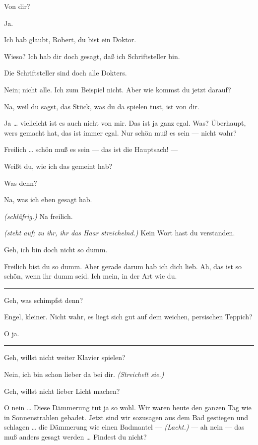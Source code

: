 \documentclass[
	final,
	a4paper,
	ngerman,
	mpinclude = true, %
	twoside = true,
	open = right,
	cleardoublepage = plain,
	DIV = 13,
	BCOR = 1cm,
	titlepage = firstiscover,
	]{scrbook}
\newcommand{\direction}[1]{\textit{(#1)}}
\newenvironment{deletion}{%
		\vspace{0.25\baselineskip}
		\hrule
		\vspace{0.25\baselineskip}
		\color{darkgray}
	}{
		\color{black}
		\vspace{0.25\baselineskip}
		\hrule 
		\vspace{0.25\baselineskip}
	}
\newcommand{\thecharacter}[1]{\textup{\textsc{#1}}\xspace}
\newcommand{\thesuesse}{\thecharacter{Süßes Mädel}}
\newcommand{\thedichter}{\thecharacter{Dichter}}
\newcommand{\character}[1]{\item[#1:]}
\newcommand{\suesse}{\character{\thesuesse}}
\newcommand{\dichter}{\character{\thedichter}}
\begin{document}
\begin{play}
	\suesse
	Von dir?

	\dichter
	Ja.

	\suesse
	Ich hab glaubt, Robert, du bist ein Doktor.

	\dichter
	Wieso? Ich hab dir doch gesagt, daß ich Schriftsteller bin.

	\suesse
	Die Schriftsteller sind doch alle Dokters.

	\dichter
	Nein; nicht alle. Ich zum Beispiel nicht. Aber wie kommst du jetzt darauf?

	\suesse
	Na, weil du sagst, das Stück, was du da spielen tust, ist von dir.

	\dichter
	Ja \ldots{} vielleicht ist es auch nicht von mir. Das ist ja ganz egal. Was? Überhaupt, wers gemacht hat, das ist immer egal. Nur schön muß es sein --- nicht wahr?

	\suesse
	Freilich \ldots{} schön muß es sein --- das ist die Hauptsach! ---

	\dichter
	Weißt du, wie ich das gemeint hab?

	\suesse
	Was denn?

	\dichter
	Na, was ich eben gesagt hab.

	\suesse
	\direction{schläfrig.} Na freilich.

	\dichter
	\direction{steht auf; zu ihr, ihr das Haar streichelnd.} Kein Wort hast du verstanden.

	\suesse
	Geh, ich bin doch nicht so dumm.

	\dichter
	Freilich bist du so dumm. Aber gerade darum hab ich dich lieb. Ah, das ist so schön, wenn ihr dumm seid. Ich mein, in der Art wie du.

	\begin{deletion}
	\suesse
	Geh, was schimpfst denn?

	\dichter
	Engel, kleiner. Nicht wahr, es liegt sich gut auf dem weichen, persischen Teppich?

	\suesse
	O ja.
	\end{deletion}
	\suesse
	Geh, willst nicht weiter Klavier spielen?

	\dichter
	Nein, ich bin schon lieber da bei dir. \direction{Streichelt sie.}

	\suesse
	Geh, willst nicht lieber Licht machen?

	\dichter
	O nein \ldots{} Diese Dämmerung tut ja so wohl. Wir waren heute den ganzen Tag wie in Sonnenstrahlen gebadet. Jetzt sind wir sozusagen aus dem Bad gestiegen und schlagen \ldots{} die Dämmerung wie einen Badmantel --- \direction{Lacht.} --- ah nein --- das muß anders gesagt werden \ldots{} Findest du nicht?


\end{play}
\end{document}
